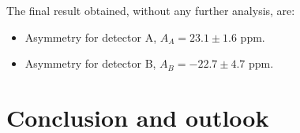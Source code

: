 The final result obtained, without any further analysis, are: 
\begin{itemize}
\item Asymmetry for detector A, $A_{A} =  23.1 \pm 1.6$ ppm.
\item Asymmetry for detector B, $A_{B} = -22.7 \pm 4.7$ ppm.
\end{itemize}


\chapter{Conclusion and outlook} \label{conclusion}

